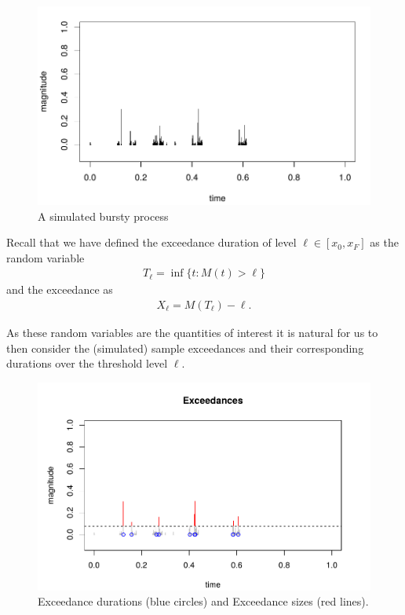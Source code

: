 \documentclass[honours,12pt]{UNSWthesis}
\newcommand{\1}{\mathbf 1}
\numberwithin{equation}{section}
\theoremstyle{definition}
\theoremstyle{remark}
\begin{document}
	\begin{figure}[H]
        \centering
        \caption{A simulated bursty process}
        \includegraphics[scale=0.45]{Figures/unitCTRMprocessNoTitle.png}
    \end{figure}

Recall that we have defined the exceedance duration of level $\ell \in [x_0,x_F]$ as
the random variable
\begin{align*}
T_\ell = \inf\{t: M(t) > \ell\}
\end{align*}
and the exceedance as 
\begin{align*}
X_\ell = M(T_\ell) - \ell.
\end{align*}

As these random variables are the quantities of interest it is natural for us to then consider the (simulated) sample exceedances and their corresponding durations over the threshold level $\ell$.
	
	\begin{figure}[H]
        \centering
        \includegraphics[width=\textwidth]{Figures/Exceedances.png}
        \caption{Exceedance durations (blue circles) and Exceedance sizes (red lines).}
    \end{figure}
\end{document}
